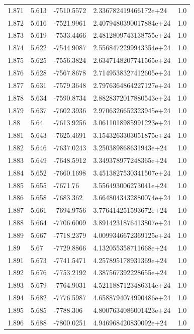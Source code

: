 \begin{tabular}{lllll}
1.871 & 5.613 & -7510.5572 & 2.336782419466172e+24 & 1.0 \\
1.872 & 5.616 & -7521.9961 & 2.4079480390017884e+24 & 1.0 \\
1.873 & 5.619 & -7533.4466 & 2.4812809743138755e+24 & 1.0 \\
1.874 & 5.622 & -7544.9087 & 2.5568472299943354e+24 & 1.0 \\
1.875 & 5.625 & -7556.3824 & 2.6347148207741565e+24 & 1.0 \\
1.876 & 5.628 & -7567.8678 & 2.7149538327412605e+24 & 1.0 \\
1.877 & 5.631 & -7579.3648 & 2.7976364864227127e+24 & 1.0 \\
1.878 & 5.634 & -7590.8734 & 2.8828372017880543e+24 & 1.0 \\
1.879 & 5.637 & -7602.3936 & 2.9706326652323945e+24 & 1.0 \\
1.88 & 5.64 & -7613.9256 & 3.0611018985991223e+24 & 1.0 \\
1.881 & 5.643 & -7625.4691 & 3.1543263303051875e+24 & 1.0 \\
1.882 & 5.646 & -7637.0243 & 3.250389868631943e+24 & 1.0 \\
1.883 & 5.649 & -7648.5912 & 3.349378977248365e+24 & 1.0 \\
1.884 & 5.652 & -7660.1698 & 3.4513827530341507e+24 & 1.0 \\
1.885 & 5.655 & -7671.76 & 3.556493006273041e+24 & 1.0 \\
1.886 & 5.658 & -7683.362 & 3.6648043432880074e+24 & 1.0 \\
1.887 & 5.661 & -7694.9756 & 3.776414251593672e+24 & 1.0 \\
1.888 & 5.664 & -7706.6009 & 3.8914231876413807e+24 & 1.0 \\
1.889 & 5.667 & -7718.2379 & 4.0099346672369125e+24 & 1.0 \\
1.89 & 5.67 & -7729.8866 & 4.132055358711668e+24 & 1.0 \\
1.891 & 5.673 & -7741.5471 & 4.257895178931369e+24 & 1.0 \\
1.892 & 5.676 & -7753.2192 & 4.387567392228655e+24 & 1.0 \\
1.893 & 5.679 & -7764.9031 & 4.5211887123486314e+24 & 1.0 \\
1.894 & 5.682 & -7776.5987 & 4.6588794074990486e+24 & 1.0 \\
1.895 & 5.685 & -7788.306 & 4.8007634086001423e+24 & 1.0 \\
1.896 & 5.688 & -7800.0251 & 4.946968420830092e+24 & 1.0 \\

\end{tabular}
